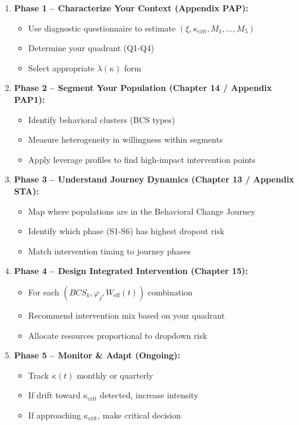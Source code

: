 \documentclass[11pt, a4paper]{article}
\begin{document}
\begin{enumerate}
    \item \textbf{Phase 1 – Characterize Your Context (Appendix PAP):}
    \begin{itemize}
        \item Use diagnostic questionnaire to estimate $(\xi, \kappa_{\text{crit}}, M_1,...,M_5)$
        \item Determine your quadrant (Q1-Q4)
        \item Select appropriate $\lambda(\kappa)$ form
    \end{itemize}

    \item \textbf{Phase 2 – Segment Your Population (Chapter 14 / Appendix PAP1):}
    \begin{itemize}
        \item Identify behavioral clusters (BCS types)
        \item Measure heterogeneity in willingness within segments
        \item Apply leverage profiles to find high-impact intervention points
    \end{itemize}

    \item \textbf{Phase 3 – Understand Journey Dynamics (Chapter 13 / Appendix STA):}
    \begin{itemize}
        \item Map where populations are in the Behavioral Change Journey
        \item Identify which phase (S1-S6) has highest dropout risk
        \item Match intervention timing to journey phases
    \end{itemize}

    \item \textbf{Phase 4 – Design Integrated Intervention (Chapter 15):}
    \begin{itemize}
        \item For each $(BCS_k, \varphi_j, W_{\text{eff}}(t))$ combination
        \item Recommend intervention mix based on your quadrant
        \item Allocate resources proportional to dropdown risk
    \end{itemize}

    \item \textbf{Phase 5 – Monitor \& Adapt (Ongoing):}
    \begin{itemize}
        \item Track $\kappa(t)$ monthly or quarterly
        \item If drift toward $\kappa_{\text{crit}}$ detected, increase intensity
        \item If approaching $\kappa_{\text{crit}}$, make critical decision
    \end{itemize}
\end{enumerate}
\end{document}
